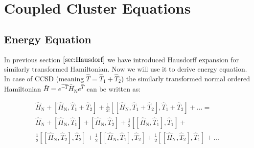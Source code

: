 \documentclass[twoside,english]{uiofysmaster}
\theoremstyle{definition}
\begin{document}
\section{Coupled Cluster Equations}
\subsection{Energy Equation}
In previous section $\ref{sec:Hausdorf}$ we have introduced Hausdorff expansion for similarly transformed Hamiltonian. Now we will use it to derive energy equation. In case of CCSD (meaning $\hat{T}=\hat{T}_1+\hat{T}_2$) the similarly transformed normal ordered Hamiltonian $\bar{H}=e^{\hat{-T}} \hat{H}_\text{N} e^{\hat{T}}$ can be written as:

\begin{eqnarray}\label{eq:hausdorf_ccsd}
 \hat{H}_\text{N} + [\hat{H}_\text{N},\hat{T}_1+\hat{T}_2] + \frac{1}{2!}[[\hat{H}_\text{N},\hat{T}_1+\hat{T}_2],\hat{T}_1+\hat{T}_2] + ...= \nonumber\\
 \hat{H}_\text{N} + [\hat{H}_\text{N},\hat{T}_1] + [\hat{H}_\text{N},\hat{T}_2] + \frac{1}{2}[[\hat{H}_\text{N},\hat{T}_1],\hat{T}_1] +\nonumber\\ \frac{1}{2}[[\hat{H}_\text{N},\hat{T}_2],\hat{T}_2] +  \frac{1}{2}[[\hat{H}_\text{N},\hat{T}_1],\hat{T}_2] + \frac{1}{2}[[\hat{H}_\text{N},\hat{T}_2],\hat{T}_1] + ...
\end{eqnarray}
\end{document}
